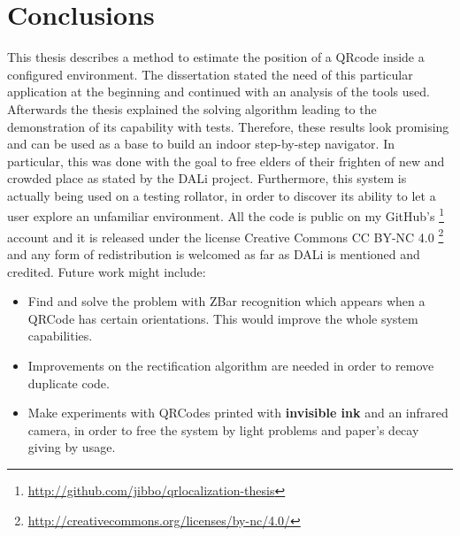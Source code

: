 \chapter{Conclusions}

This thesis describes a method to estimate the position of a QRcode inside a configured environment.
The dissertation stated the need of this particular application at the beginning and continued with an analysis of the tools used. Afterwards the thesis explained the solving algorithm leading to the demonstration of its capability with tests. Therefore, these results look promising and can be used as a base to build an indoor step-by-step navigator. In particular, this was done with the goal to free elders of their frighten of new and crowded place as stated by the DALi project. Furthermore, this system is actually being used on a testing rollator, in order to discover its ability to let a user explore an unfamiliar environment. All the code is public on my GitHub's \footnote{ \url{http://github.com/jibbo/qrlocalization-thesis} } account and it is released under the license Creative Commons CC BY-NC 4.0 \footnote{\url{http://creativecommons.org/licenses/by-nc/4.0/}} and any form of redistribution is welcomed as far as DALi is mentioned and credited.\newline
Future work might include:
\begin{itemize}
	\item Find and solve the problem with ZBar recognition which appears when a QRCode has certain orientations. This would improve the whole system capabilities.
	\item Improvements on the rectification algorithm are needed in order to remove duplicate code.
	\item Make experiments with QRCodes printed with \textbf{invisible ink} and an infrared camera, in order to free the system by light problems and paper's decay giving by usage. 
\end{itemize}       